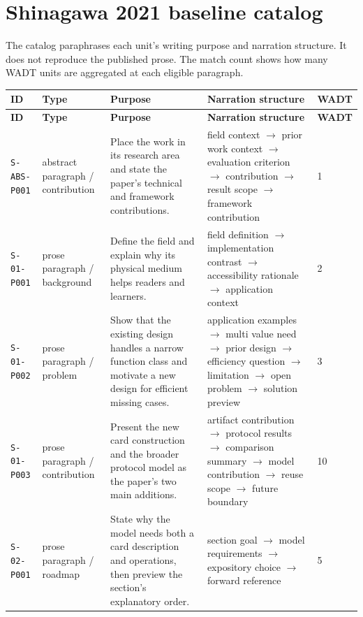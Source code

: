 \documentclass[10pt]{article}
\begin{document}
\section{Shinagawa 2021 baseline catalog}
The catalog paraphrases each unit's writing purpose and narration structure. It does not reproduce the published prose. The match count shows how many WADT units are aggregated at each eligible paragraph.
\scriptsize\setlength{\tabcolsep}{3pt}\renewcommand{\arraystretch}{1.15}
\begin{longtable}{@{}p{}p{}p{}p{}p{}@{}}
\toprule\textbf{ID}&\textbf{Type}&\textbf{Purpose}&\textbf{Narration structure}&\textbf{WADT}\\\midrule\endfirsthead
\toprule\textbf{ID}&\textbf{Type}&\textbf{Purpose}&\textbf{Narration structure}&\textbf{WADT}\\\midrule\endhead
\texttt{S-ABS-P001}&abstract paragraph / contribution&Place the work in its research area and state the paper's technical and framework contributions.&field context $\rightarrow$ prior work context $\rightarrow$ evaluation criterion $\rightarrow$ contribution $\rightarrow$ result scope $\rightarrow$ framework contribution&1\\
\texttt{S-01-P001}&prose paragraph / background&Define the field and explain why its physical medium helps readers and learners.&field definition $\rightarrow$ implementation contrast $\rightarrow$ accessibility rationale $\rightarrow$ application context&2\\
\texttt{S-01-P002}&prose paragraph / problem&Show that the existing design handles a narrow function class and motivate a new design for efficient missing cases.&application examples $\rightarrow$ multi value need $\rightarrow$ prior design $\rightarrow$ efficiency question $\rightarrow$ limitation $\rightarrow$ open problem $\rightarrow$ solution preview&3\\
\texttt{S-01-P003}&prose paragraph / contribution&Present the new card construction and the broader protocol model as the paper's two main additions.&artifact contribution $\rightarrow$ protocol results $\rightarrow$ comparison summary $\rightarrow$ model contribution $\rightarrow$ reuse scope $\rightarrow$ future boundary&10\\
\texttt{S-02-P001}&prose paragraph / roadmap&State why the model needs both a card description and operations, then preview the section's explanatory order.&section goal $\rightarrow$ model requirements $\rightarrow$ expository choice $\rightarrow$ forward reference&5\\

\end{longtable}
\end{document}
